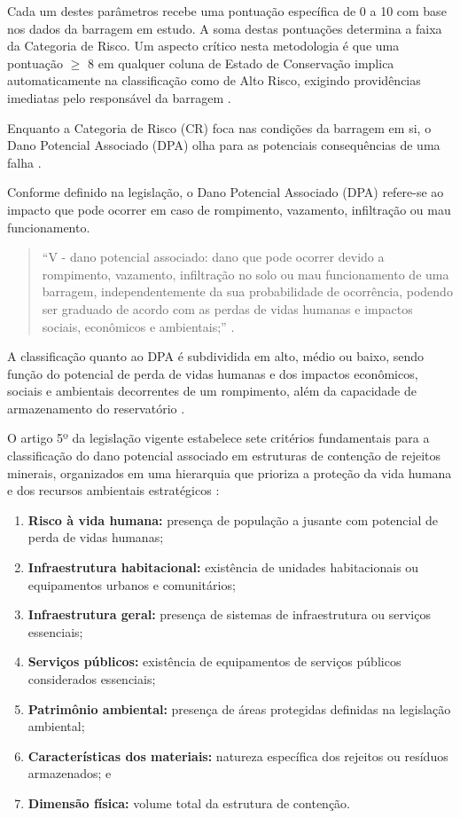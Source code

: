 Cada um destes parâmetros recebe uma pontuação específica de 0 a 10 com base nos dados da barragem em estudo. A soma destas pontuações determina a faixa da Categoria de Risco. Um aspecto crítico nesta metodologia é que uma pontuação $\geq$ 8 em qualquer coluna de Estado de Conservação implica automaticamente na classificação como de Alto Risco, exigindo providências imediatas pelo responsável da barragem \cite{cnrh2012}.

Enquanto a Categoria de Risco (CR) foca nas condições da barragem em si, o Dano Potencial Associado (\textsc{DPA}) olha para as potenciais consequências de uma falha \cite{cnrh2012}.

Conforme definido na legislação, o Dano Potencial Associado (\textsc{DPA}) refere-se ao impacto que pode ocorrer em caso de rompimento, vazamento, infiltração ou mau funcionamento.

\begin{quote}
``V - dano potencial associado: dano que pode ocorrer devido a rompimento, vazamento, infiltração no solo ou mau funcionamento de uma barragem, independentemente da sua probabilidade de ocorrência, podendo ser graduado de acordo com as perdas de vidas humanas e impactos sociais, econômicos e ambientais;'' \cite{cnrh2012}.
\end{quote}

A classificação quanto ao \textsc{DPA} é subdividida em alto, médio ou baixo, sendo função do potencial de perda de vidas humanas e dos impactos econômicos, sociais e ambientais decorrentes de um rompimento, além da capacidade de armazenamento do reservatório \cite{brasil2010pnsb,geoscan2020}.

O artigo 5º da legislação vigente estabelece sete critérios fundamentais para a classificação do dano potencial associado em estruturas de contenção de rejeitos minerais, organizados em uma hierarquia que prioriza a proteção da vida humana e dos recursos ambientais estratégicos \cite{brasil2010pnsb}:

\begin{enumerate}
    \item \textbf{Risco à vida humana:} presença de população a jusante com potencial de perda de vidas humanas;
    \item \textbf{Infraestrutura habitacional:} existência de unidades habitacionais ou equipamentos urbanos e comunitários;
    \item \textbf{Infraestrutura geral:} presença de sistemas de infraestrutura ou serviços essenciais;
    \item \textbf{Serviços públicos:} existência de equipamentos de serviços públicos considerados essenciais;
    \item \textbf{Patrimônio ambiental:} presença de áreas protegidas definidas na legislação ambiental;
    \item \textbf{Características dos materiais:} natureza específica dos rejeitos ou resíduos armazenados; e
    \item \textbf{Dimensão física:} volume total da estrutura de contenção.
\end{enumerate}


